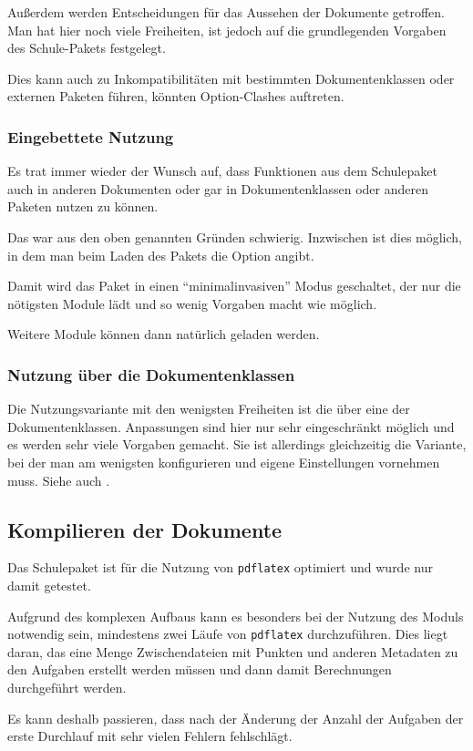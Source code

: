 		Außerdem werden Entscheidungen für das Aussehen der Dokumente 
		getroffen. Man hat hier noch viele Freiheiten, ist jedoch auf
		die grundlegenden Vorgaben des Schule-Pakets festgelegt.
		
		Dies kann auch zu Inkompatibilitäten mit bestimmten
		Dokumentenklassen oder externen Paketen führen, \zB\space
		könnten Option-Clashes auftreten.
	
	\subsubsection{Eingebettete Nutzung}
		Es trat immer wieder der Wunsch auf, dass Funktionen aus dem
		Schulepaket auch in anderen Dokumenten oder gar in
		Dokumentenklassen oder anderen Paketen nutzen zu können.
		
		Das war aus den oben genannten Gründen schwierig. Inzwischen
		ist dies möglich, in dem man beim Laden des Pakets die Option
		 angibt.
		
		Damit wird das Paket in einen \enquote{minimalinvasiven} Modus
		geschaltet, der nur die nötigsten Module lädt und so wenig
		Vorgaben macht wie möglich.
		
		Weitere Module können dann natürlich geladen werden.
	
	\subsubsection{Nutzung über die Dokumentenklassen}
		Die Nutzungsvariante mit den wenigsten Freiheiten ist die
		über eine der Dokumentenklassen. Anpassungen sind hier nur
		sehr eingeschränkt möglich und es werden sehr viele Vorgaben
		gemacht. Sie ist allerdings gleichzeitig die Variante, bei
		der man am wenigsten konfigurieren und eigene Einstellungen
		vornehmen muss. Siehe auch .
		
\subsection{Kompilieren der Dokumente}
	Das Schulepaket ist für die Nutzung von \texttt{pdflatex} 
	optimiert und wurde nur damit getestet.  
	
	Aufgrund des komplexen Aufbaus kann es besonders bei der Nutzung 
	des Moduls  notwendig sein, mindestens zwei
	Läufe von \texttt{pdflatex} durchzuführen. Dies liegt daran, das 
	eine Menge Zwischendateien mit Punkten und anderen Metadaten zu 
	den Aufgaben erstellt werden müssen und dann damit Berechnungen
	durchgeführt werden.
	
	Es kann deshalb passieren, dass nach der Änderung der Anzahl der 
	Aufgaben der erste Durchlauf mit sehr vielen Fehlern fehlschlägt.
